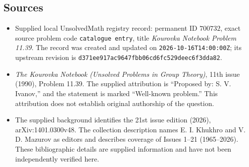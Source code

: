 \documentclass[11pt]{article}
\begin{document}
\subsection{Sources}
\begin{itemize}
\item Supplied local UnsolvedMath registry record: permanent ID \(700732\), exact source problem code \texttt{catalogue entry}, title \emph{Kourovka Notebook Problem 11.39}. The record was created and updated on \texttt{2026-10-16T14:00:00Z}; its upstream revision is \texttt{d371ee917ac9647fbb06cd6fc529deec6f3dda82}.
\item \emph{The Kourovka Notebook (Unsolved Problems in Group Theory)}, 11th issue (1990), Problem 11.39. The supplied attribution is ``Proposed by: S. V. Ivanov,'' and the statement is marked ``Well-known problem.'' This attribution does not establish original authorship of the question.
\item The supplied background identifies the 21st issue edition (2026), arXiv:1401.0300v48. The collection description names E. I. Khukhro and V. D. Mazurov as editors and describes coverage of Issues 1--21 (1965--2026). These bibliographic details are supplied information and have not been independently verified here.
\end{itemize}
\end{document}
